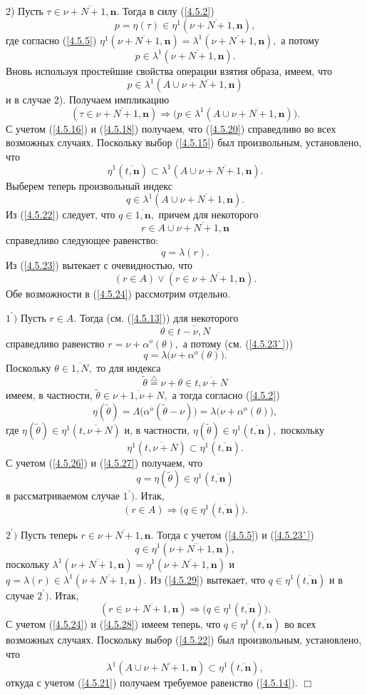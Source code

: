 \documentclass[11pt,twoside,openany]{report}
\newcommand{\bfn}{\begin{equation}}
\newcommand{\efn}{\end{equation}}
\newcommand{\df}{\stackrel{\triangle}{=}}
\newcommand{\ov}{\overline}
\newcommand{\La}{\Lambda}
\newcommand{\la}{\lambda}
\newcommand{\al}{\alpha}
\begin{document}
{{2) Пусть $\tau \in \ov{\nu+N+1,\mathbf{n}}.$ Тогда в силу (\ref{4.5.2})
$$
p= \eta(\tau) \in \eta^1(\ov{\nu+N+1,\mathbf{n}}),
$$
где согласно (\ref{4.5.5}) $\eta^1(\ov{\nu+N+1,\mathbf{n}}) =
\la^1(\ov{\nu+N+1,\mathbf{n}}),$ а потому
\bfn\label{4.5.19}
p\in \la^1(\ov{\nu+N+1,\mathbf{n}}).
\efn
Вновь используя простейшие свойства  операции взятия образа, имеем, что
\bfn\label{4.5.20}p\in \la^1(A \cup \ov{\nu+N+1,\mathbf{n}})
\efn
и в случае 2). Получаем импликацию
$$
(\tau\in \ov{\nu+N+1,\mathbf{n}})\Longrightarrow \bigl(p\in \la^1(A \cup
\ov{\nu+N+1,\mathbf{n}})\bigl).
$$
С учетом (\ref{4.5.16}) и (\ref{4.5.18}) получаем, что (\ref{4.5.20})
справедливо во всех возможных случаях. Поскольку выбор (\ref{4.5.15}) был
произвольным, установлено, что
\bfn\label{4.5.21}
\eta^1(\ov{t,\mathbf{n}}) \subset \la^1(A \cup \ov{\nu+N+1,\mathbf{n}}).
\efn
Выберем теперь произвольный индекс
\bfn\label{4.5.22}q\in  \la^1(A \cup \ov{\nu+N+1,\mathbf{n}}).
\efn
 Из (\ref{4.5.22}) следует, что $q\in \ov{1,\mathbf{n}},$ причем для некоторого
 \bfn\label{4.5.23}r \in A \cup \ov{\nu+N+1,\mathbf{n}}
 \efn
 справедливо следующее равенство:
 \bfn\label{4.5.23`}q = \la(r).
 \efn
 Из (\ref{4.5.23})  вытекает с очевидностью, что
 \bfn\label{4.5.24}(r\in A) \vee (r\in  \ov{\nu+N+1,\mathbf{n}}).
 \efn
 Обе возможности в (\ref{4.5.24}) рассмотрим отдельно.

$1^\prime)$  Пусть $r\in A.$ Тогда (см. (\ref{4.5.13})) для некоторого
\bfn\label{4.5.25}\theta\in \ov{t-\nu,N}
\efn
справедливо равенство $r = \nu + \al^o(\theta),$ а потому (см. (\ref{4.5.23`}))
\bfn\label{4.5.26}q = \la\bigl(\nu + \al^o(\theta)\bigl).
\efn
Поскольку $\theta\in\ov{1,N},$ то для индекса
$$\widetilde{\theta} \df \nu +\theta \in \ov{t,\nu+N}
$$
имеем, в частности, $\widetilde{\theta}\in \ov{\nu+1,\nu +N},$ а тогда
согласно (\ref{4.5.2}) \bfn\label{4.5.27}\eta(\widetilde{\theta}) =
\La\bigl(\al^o(\widetilde{\theta}-\nu)\bigl) = \la\bigl(\nu+ \al^o(\theta)\bigl),
\efn
где $\eta(\widetilde{\theta}) \in \eta^1(\ov{t,\nu+N})$ и, в частности,
$\eta(\widetilde{\theta}) \in \eta^1(\ov{t,\mathbf{n}}),$ поскольку
$$\eta^1(\ov{t,\nu+N})\subset \eta^1(\ov{t,\mathbf{n}}).
$$
С учетом (\ref{4.5.26}) и (\ref{4.5.27}) получаем, что
$$q = \eta(\widetilde{\theta}) \in \eta^1(\ov{t,\mathbf{n}})
$$
в рассматриваемом случае $1^\prime).$  Итак,
\bfn\label{4.5.28}(r\in A) \Longrightarrow \bigl(q \in \eta^1(\ov{t,\mathbf{n}})\bigl).
\efn

$2^\prime)$  Пусть теперь $r\in \ov{\nu+N +1,\mathbf{n}}.$ Тогда с учетом
(\ref{4.5.5}) и (\ref{4.5.23`})
\bfn\label{4.5.29}q\in \eta^1(\ov{\nu+N+1,\mathbf{n}}),
\efn
поскольку $\la^1(\ov{\nu+N+1,\mathbf{n}})= \eta^1(\ov{\nu+N+1,\mathbf{n}})$ и
$q = \la(r)\in \la^1(\ov{\nu+N+1,\mathbf{n}}).$ Из (\ref{4.5.29}) вытекает, что
$q\in \eta^1(\ov{t,\mathbf{n}})$ и в случае $2^\prime).$  Итак,
$$(r\in \ov{\nu+N+1,\mathbf{n}})\Longrightarrow \bigl(q\in \eta^1(\ov{t,\mathbf{n}})\bigl).
$$
С учетом (\ref{4.5.24}) и (\ref{4.5.28}) имеем теперь, что
$q\in \eta^1(\ov{t,\mathbf{n}})$ во всех возможных случаях. Поскольку выбор
(\ref{4.5.22}) был произвольным, установлено, что
$$\la^1(A \cup \ov{\nu+N+1,\mathbf{n}})\subset \eta^1(\ov{t,\mathbf{n}}),
$$
откуда с учетом (\ref{4.5.21}) получаем требуемое равенство (\ref{4.5.14}). \hfill $\Box$

}}
\end{document}
